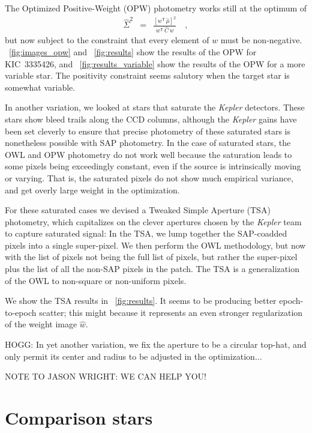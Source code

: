 \documentclass[12pt, letterpaper, preprint]{aastex}
\newcommand{\project}[1]{\textsl{#1}}
\newcommand{\transpose}[1]{{#1}^{\!\mathsf T}}
\begin{document}
The Optimized Positive-Weight (OPW) photometry works still at the optimum of
\begin{eqnarray}
\hat{\Sigma}^2 &=& \frac{[\transpose{w}\, \hat{\mu}]^2}{\transpose{w}\, \hat{C}\, w}
\quad ,
\end{eqnarray}
but now subject to the constraint that every element of $w$ must be non-negative.
\figurename~\ref{fig:images_opw} and \figurename~\ref{fig:results}
 show the results of the OPW for KIC~3335426,
 and \figurename~\ref{fig:results_variable} show the results of the OPW
 for a more variable star.
The positivity constraint seems salutory when the target star is somewhat variable.

In another variation, we looked at stars that saturate the \project{Kepler} detectors.
These stars show bleed trails along the CCD columns,
  although the \project{Kepler} gains have been set cleverly
  to ensure that precise photometry of these saturated stars is nonetheless possible with SAP photometry.
In the case of saturated stars, the OWL and OPW photometry do not work well
  because the saturation leads to some pixels being exceedingly constant,
  even if the source is intrinsically moving or varying.
That is, the saturated pixels do not show much empirical variance,
  and get overly large weight in the optimization.

For these saturated cases we devised a Tweaked Simple Aperture (TSA) photometry,
  which capitalizes on the clever apertures chosen by the \project{Kepler} team
  to capture saturated signal:
In the TSA, we lump together the SAP-coadded pixels into a single super-pixel.
We then perform the OWL methodology,
  but now with the list of pixels not being the full list of pixels,
  but rather the super-pixel plus the list of all the non-SAP pixels in the patch.
The TSA is a generalization of the OWL to non-square or non-uniform pixels.

We show the TSA results in \figurename~\ref{fig:results}.
It seems to be producing better epoch-to-epoch scatter;
  this might because it represents an even stronger regularization of the weight image $\hat{w}$.

HOGG:
In yet another variation, we fix the aperture to be a circular top-hat,
  and only permit its center and radius to be adjusted in the optimization...

NOTE TO JASON WRIGHT: WE CAN HELP YOU!

\section{Comparison stars}
\end{document}
